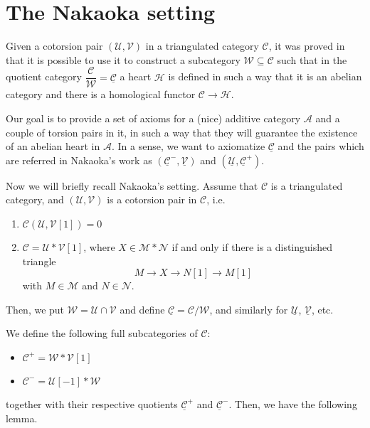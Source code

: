 \section{The Nakaoka setting}

Given a cotorsion pair $(\mathcal{U},\mathcal{V})$ in a triangulated category $\mathcal{C}$,
it was proved in \cite{nakaoka2011general} that it is possible to use it to
construct a subcategory $\mathcal{W}\subseteq\mathcal{C}$ such that in the quotient category
$\dfrac{\mathcal{C}}{\mathcal{W}}=\underline{\mathcal{C}}$ a heart $\mathcal{H}$ is defined
in such a way that it is an abelian category and there is a homological functor $\mathcal{C}\to \mathcal{H}$.

Our goal is to provide a set of axioms for a (nice) additive category $\mathcal{A}$
and a couple of torsion pairs in it, in such a way that they will guarantee the existence
of an abelian heart in $\mathcal{A}$. In a sense, we want to axiomatize $\underline{\mathcal{C}}$ and
the pairs which are referred in Nakaoka's work as $(\underline{\mathcal{C}}^-,\underline{\mathcal{V}})$ and
$(\underline{\mathcal{U}},\underline{\mathcal{C}}^+)$.

Now we will briefly recall Nakaoka's setting. Assume that $\mathcal{C}$ is a triangulated category,
and $(\mathcal{U},\mathcal{V})$ is a cotorsion pair in $\mathcal{C}$, i.e.
\begin{enumerate}
  \item $\mathcal{C}(\mathcal{U},\mathcal{V}[1])=0$
  \item $\mathcal{C}=\mathcal{U}\ast \mathcal{V}[1]$, where $X\in \mathcal{M}\ast\mathcal{N}$ if and only if there
  is a distinguished triangle
  \begin{equation*}
    M\to X\to N[1] \to M[1]
  \end{equation*}
  with $M\in \mathcal{M}$ and $N\in\mathcal{N}$.
\end{enumerate}

Then, we put $\mathcal{W}=\mathcal{U}\cap\mathcal{V}$ and define $\underline{\mathcal{C}}=\mathcal{C}/\mathcal{W}$,
and similarly for $\underline{\mathcal{U}}$, $\underline{\mathcal{V}}$, etc.

We define the following full subcategories of $\mathcal{C}$:
\begin{itemize}
  \item $\mathcal{C}^+ = \mathcal{W}\ast\mathcal{V}[1]$
  \item $\mathcal{C}^- = \mathcal{U}[-1]\ast\mathcal{W}$
\end{itemize}
together with their respective quotients $\underline{\mathcal{C}}^+$ and $\underline{\mathcal{C}}^-$.
Then, we have the following lemma.


